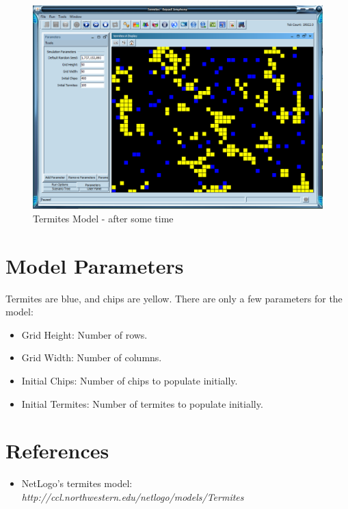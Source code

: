 \documentclass[11pt]{amsart}
\begin{document}
\begin{figure}[h]
\begin{center}
\vspace{.2in}
\centerline {
\includegraphics[width=5in]{Images/termite_after.png}}
\caption{Termites Model - after some time }
\label{fig:termite_after}
\end{center}
\end{figure}


\section{Model Parameters}

Termites are blue, and chips are yellow.  There are only a few parameters for the model: 

\begin{itemize}
\item Grid Height:  Number of rows.
\item Grid Width:  Number of columns.
\item Initial Chips:  Number of chips to populate initially.
\item Initial Termites:  Number of termites to populate initially.
\end{itemize}
\vspace{.2in}

\section {References}

\begin{itemize}
\item NetLogo's termites model: \emph{http://ccl.northwestern.edu/netlogo/models/Termites}
\end{itemize}
\end{document}

